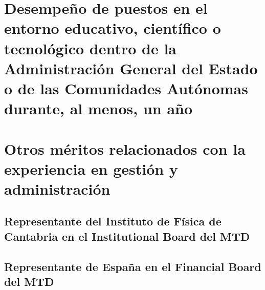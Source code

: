 \documentclass[a4paper, 11pt, twoside, openright]{report}
\begin{document}
\section{Desempeño de puestos en el entorno educativo, científico o tecnológico dentro de la Administración General del Estado o de las Comunidades Autónomas durante, al menos, un año}

\section{Otros méritos relacionados con la experiencia en gestión y administración}

\subsection{Representante del Instituto de Física de Cantabria en el Institutional Board del MTD}


\subsection{Representante de España en el Financial Board del MTD}

\end{document}
